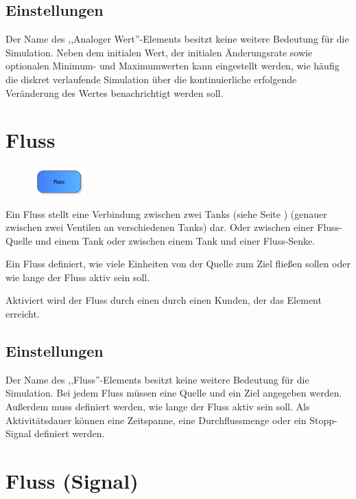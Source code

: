 \subsection*{Einstellungen}

Der Name des ,,Analoger Wert''-Elements besitzt keine weitere Bedeutung für die Simulation.
Neben dem initialen Wert, der initialen Änderungsrate sowie optionalen Minimum- und Maximumwerten
kann eingestellt werden, wie häufig die diskret verlaufende Simulation über die kontinuierliche
erfolgende Veränderung des Wertes benachrichtigt werden soll.


\section{Fluss}
\label{ref:ModelElementTankFlowByClient}

\begin{figure}
\vspace{-22pt}
\includegraphics[width=2cm]{imageModelElementTankFlowByClient.png}
\vspace{-22pt}
\end{figure}

Ein Fluss stellt eine Verbindung zwischen zwei Tanks (siehe Seite \pageref{ref:ModelElementTank}) 
(genauer zwischen zwei Ventilen an verschiedenen Tanks) dar.
Oder zwischen einer Fluss-Quelle und einem Tank oder zwischen einem Tank und einer Fluss-Senke.

Ein Fluss definiert, wie viele Einheiten von der Quelle zum Ziel fließen sollen oder wie
lange der Fluss aktiv sein soll.

Aktiviert wird der Fluss durch einen durch einen Kunden, der das Element erreicht.

\subsection*{Einstellungen}

Der Name des ,,Fluss''-Elements besitzt keine weitere Bedeutung für die Simulation.
Bei jedem Fluss müssen eine Quelle und ein Ziel angegeben werden.
Außerdem muss definiert werden, wie lange der Fluss aktiv sein soll. Als Aktivitätsdauer
können eine Zeitspanne, eine Durchflussmenge oder ein Stopp-Signal definiert werden.


\section{Fluss (Signal)}
\label{ref:ModelElementTankFlowBySignal}

